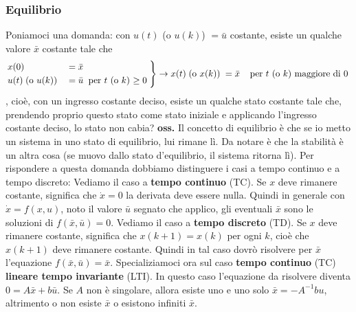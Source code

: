 \subsubsection{Equilibrio}
Poniamoci una domanda: con $u(t)$ (o $u(k)$) $=\bar{u}$ costante, esiste un qualche valore $\bar{x}$ costante tale che 
\[
    \begin{rcases}
        x(0) &= \bar{x}\\
        u(t) \;\text{(o $u(k)$)}\; &= \bar{u} \;\;\text{per $t$ (o $k$) $\geq 0$}\;
    \end{rcases} \rightarrow x(t) \;\text{(o $x(k)$)}\; = \bar{x} \;\;\;\;\text{per $t$ (o $k$) maggiore di 0}\;
\]
, cioè, con un ingresso costante deciso, esiste un qualche stato costante tale che, prendendo proprio questo stato come stato iniziale e applicando l'ingresso costante deciso, lo stato non cabia?\newline
\newline
\textbf{oss.} Il concetto di equilibrio è che se io metto un sistema in uno stato di equilibrio, lui rimane lì. Da notare è che la stabilità è un altra cosa (se muovo dallo stato d'equilibrio, il sistema ritorna lì).\newline
\newline
Per rispondere a questa domanda dobbiamo distinguere i casi a tempo continuo e a tempo discreto:\newline
\newline
Vediamo il caso a \textbf{tempo continuo} (TC). Se $x$ deve rimanere costante, significa che $\dot{x} = 0$ la derivata deve essere nulla. Quindi in generale con $\dot{x} = f(x,u)$, noto il valore $\bar{u}$ segnato che applico, gli eventuali $\bar{x}$ sono le soluzioni di $f(\bar{x}, \bar{u}) = 0$.\newline
\newline
Vediamo il caso a \textbf{tempo discreto} (TD). Se $x$ deve rimanere costante, significa che $x(k+1) = x(k)$ per ogni $k$, cioè che $x(k+1)$ deve rimanere costante. Quindi in tal caso dovrò risolvere per $\bar{x}$ l'equazione $f(\bar{x}, \bar{u}) = \bar{x}$.\newline
\newline
Specializiamoci ora sul caso \textbf{tempo continuo} (TC) \textbf{lineare tempo invariante} (LTI). In questo caso l'equazione da risolvere diventa $0 = A \bar{x} + b \bar{u}$. Se $A$ non è singolare, allora esiste uno e uno solo $\bar{x} = -A^{-1} b u$, altrimento o non esiste $\bar{x}$ o esistono infiniti $\bar{x}$.\newline
\newline

